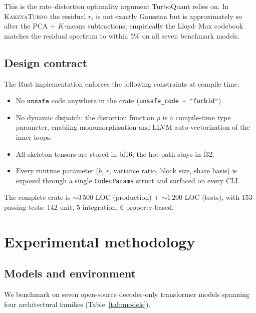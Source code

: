 \documentclass[11pt,a4paper]{article}
\theoremstyle{definition}
\theoremstyle{plain}
\begin{document}
This is the rate--distortion optimality argument TurboQuant relies on. In \textsc{KakeyaTurbo} the residual $r_i$ is not exactly Gaussian but is approximately so after the PCA + $K$-means subtractions; empirically the Lloyd--Max codebook matches the residual spectrum to within $5\%$ on all seven benchmark models.

\subsection{Design contract}

The Rust implementation enforces the following constraints at compile time:
\begin{itemize}[leftmargin=*]
  \item No $\texttt{unsafe}$ code anywhere in the crate (\verb|unsafe_code = "forbid"|).
  \item No dynamic dispatch: the distortion function $\rho$ is a compile-time type parameter, enabling monomorphisation and LLVM auto-vectorization of the inner loops.
  \item All skeleton tensors are stored in bf16; the hot path stays in f32.
  \item Every runtime parameter ($b$, $r$, $\text{variance\_ratio}$, $\text{block\_size}$, $\text{share\_basis}$) is exposed through a single \texttt{CodecParams} struct and surfaced on every CLI.
\end{itemize}

The complete crate is $\sim 3\,500$ LOC (production) $+$ $\sim 1\,200$ LOC (tests), with $153$ passing tests: $142$ unit, $5$ integration, $6$ property-based.

\section{Experimental methodology}
\label{sec:methodology}

\subsection{Models and environment}
We benchmark on seven open-source decoder-only transformer models spanning four architectural families (Table~\ref{tab:models}).
\end{document}

